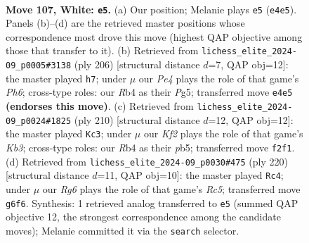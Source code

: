 \documentclass[11pt]{article}
\begin{document}
\clearpage

\begin{figure}[p]\centering
\begin{subfigure}{0.46\textwidth}\centering
\resizebox{\linewidth}{!}{%
\newchessgame
\chessboard[
  setfen={8/3k4/4p1R1/8/1R2PP2/r7/5K2/8 w - - 5 107},
  showmover=false,
  pgfstyle=straightmove, color=movearrow, markmove={e4-e5}
]}
\caption{}
\end{subfigure}\hfill
\begin{subfigure}{0.46\textwidth}\centering
\resizebox{\linewidth}{!}{%
\newchessgame
\chessboard[
  setfen={8/4R3/6pP/6P1/3k4/4p1K1/8/5r2 w - - 2 104},
  showmover=false,
  pgfstyle=straightmove, color=movearrow, markmove={h6-h7}
]}
\caption{}
\end{subfigure}
\\[4pt]
\begin{subfigure}{0.46\textwidth}\centering
\resizebox{\linewidth}{!}{%
\newchessgame
\chessboard[
  setfen={8/8/5k2/1p4pR/8/1K5P/7r/8 w - - 12 106},
  showmover=false,
  pgfstyle=straightmove, color=movearrow, markmove={b3-c3}
]}
\caption{}
\end{subfigure}\hfill
\begin{subfigure}{0.46\textwidth}\centering
\resizebox{\linewidth}{!}{%
\newchessgame
\chessboard[
  setfen={8/8/7k/2R4p/7P/6P1/7K/1r6 w - - 67 111},
  showmover=false,
  pgfstyle=straightmove, color=movearrow, markmove={c5-c4}
]}
\caption{}
\end{subfigure}
\caption{\textbf{Move 107, White: \texttt{e5}.} (a) Our position; Melanie plays \texttt{e5} (\texttt{e4e5}). Panels (b)--(d) are the retrieved master positions whose correspondence most drove this move (highest QAP objective among those that transfer to it). (b) Retrieved from \texttt{lichess\_elite\_2024-09\_p0005\#3138} (ply 206) [structural distance $d$=7, QAP obj=12]: the master played \texttt{h7}; under $\mu$ our \emph{Pe4} plays the role of that game's \emph{Ph6}; cross-type roles: our \emph{R}b4 as their \emph{P}g5; transferred move \texttt{e4e5} \textbf{(endorses this move)}. (c) Retrieved from \texttt{lichess\_elite\_2024-09\_p0024\#1825} (ply 210) [structural distance $d$=12, QAP obj=12]: the master played \texttt{Kc3}; under $\mu$ our \emph{Kf2} plays the role of that game's \emph{Kb3}; cross-type roles: our \emph{R}b4 as their \emph{p}b5; transferred move \texttt{f2f1}. (d) Retrieved from \texttt{lichess\_elite\_2024-09\_p0030\#475} (ply 220) [structural distance $d$=11, QAP obj=10]: the master played \texttt{Rc4}; under $\mu$ our \emph{Rg6} plays the role of that game's \emph{Rc5}; transferred move \texttt{g6f6}. Synthesis: 1 retrieved analog transferred to \texttt{e5} (summed QAP objective 12, the strongest correspondence among the candidate moves); Melanie committed it via the \texttt{search} selector.}
\label{fig:thought-m212}
\end{figure}
\end{document}
